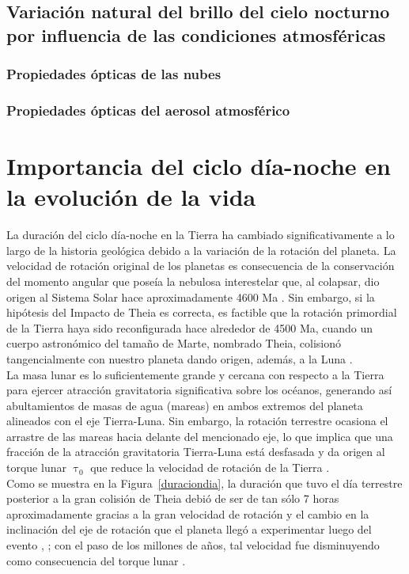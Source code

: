 \subsection{Variación natural del brillo del cielo nocturno por influencia de las condiciones atmosféricas}

\subsubsection{Propiedades ópticas de las nubes}

\subsubsection{Propiedades ópticas del aerosol atmosférico}


\section{Importancia del ciclo día-noche en la evolución de la vida}

La duración del ciclo día-noche en la Tierra ha cambiado significativamente a lo largo de la historia geológica debido a la variación de la rotación del planeta. La velocidad de rotación original de los planetas  es consecuencia de la conservación del momento angular que poseía la nebulosa interestelar que, al colapsar, dio origen al Sistema Solar hace aproximadamente 4600 Ma \citep{Greaves2005}. Sin embargo, si la hipótesis del Impacto de Theia es correcta, es factible que la rotación primordial de la Tierra haya sido reconfigurada hace alrededor de 4500 Ma, cuando un cuerpo astronómico del tamaño de Marte, nombrado Theia, colisionó tangencialmente con nuestro planeta dando origen, además, a la Luna \citep{Stevenson1987}.\\

La masa lunar es lo suficientemente grande y cercana con respecto a la Tierra para ejercer atracción gravitatoria significativa sobre los océanos, generando así abultamientos de masas de agua (mareas) en ambos extremos del planeta alineados con el eje Tierra-Luna. Sin embargo, la rotación terrestre ocasiona el arrastre de las mareas hacia delante del mencionado eje, lo que implica que una fracción de la atracción gravitatoria Tierra-Luna está desfasada y da origen al torque lunar $\uptau_0$ que reduce la velocidad de rotación de la Tierra \citep{Conway1982}.\\ 

Como se muestra en la Figura~\ref{duraciondia}, la duración que tuvo el día terrestre posterior a la gran colisión de Theia debió de ser de tan sólo 7 horas aproximadamente gracias a la gran velocidad de rotación y el cambio en la inclinación del eje de rotación que el planeta llegó a experimentar luego del evento \citep{Stevenson&Bartlett2016}, \citep{Stevenson1987}; con el paso de los millones de años, tal velocidad fue disminuyendo como consecuencia del torque lunar \citep{Conway1982}.\\ 

